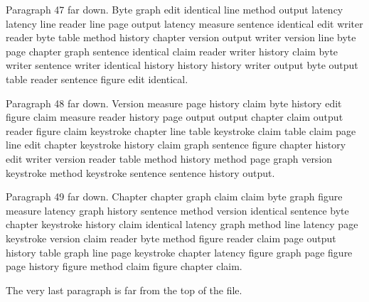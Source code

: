 \documentclass{article}
\begin{document}
Paragraph 47 far down. Byte graph edit identical line method output latency latency line reader line page output latency measure sentence identical edit writer reader byte table method history chapter version output writer version line byte page chapter graph sentence identical claim reader writer history claim byte writer sentence writer identical history history history writer output byte output table reader sentence figure edit identical.

Paragraph 48 far down. Version measure page history claim byte history edit figure claim measure reader history page output output chapter claim output reader figure claim keystroke chapter line table keystroke claim table claim page line edit chapter keystroke history claim graph sentence figure chapter history edit writer version reader table method history method page graph version keystroke method keystroke sentence sentence history output.

Paragraph 49 far down. Chapter chapter graph claim claim byte graph figure measure latency graph history sentence method version identical sentence byte chapter keystroke history claim identical latency graph method line latency page keystroke version claim reader byte method figure reader claim page output history table graph line page keystroke chapter latency figure graph page figure page history figure method claim figure chapter claim.

The very last paragraph is far from the top of the file.
\end{document}
